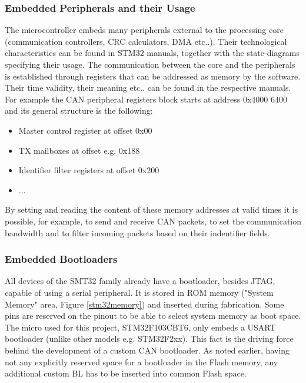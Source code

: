 \documentclass[11pt]{article} %
\begin{document}
\subsubsection{Embedded Peripherals and their Usage}
The microcontroller embeds many peripherals external to the processing core (communication controllers, CRC calculators, DMA etc..). Their technological characteristics can be found in STM32 manuals, together with the state-diagrams specifying their usage. The communication between the core and the peripherals is established through registers that can be addressed as memory by the software. Their time validity, their meaning etc.. can be found in the respective manuals. For example the CAN peripheral registers block starts at address 0x4000 6400 and its general structure is the following:
\begin{itemize}
\item Master control register at offset 0x00
\item TX mailboxes at offset e.g. 0x188
\item Identifier filter registers at offset 0x200
\item ...
\end{itemize}
By setting and reading the content of these memory addresses at valid times it is possible, for example, to send and receive CAN packets, to set the communication bandwidth and to filter incoming packets based on their indentifier fields. 

\subsubsection{Embedded Bootloaders}
\label{embeddedbootloaders}
All devices of the SMT32 family already have a bootloader, besides JTAG, capable of using a serial peripheral. It is stored in ROM memory ("System Memory" area, Figure \ref{stm32memory}) and inserted during fabrication. Some pins are reserved on the pinout to be able to select system memory as boot space.
The micro used for this project, STM32F103CBT6, only embeds a USART bootloader (unlike other models e.g. STM32F2xx). This fact is the driving force behind the development of a custom CAN bootloader. As noted earlier, having not any explicitly reserved space for a bootloader in the Flash memory, any additional custom BL has to be inserted into common Flash space.
\end{document}
